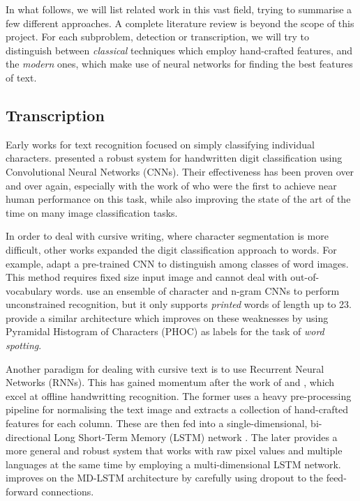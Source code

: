 	In what follows, we will list related work in this vast field, trying to summarise a few different approaches. A complete literature review is beyond the scope of this project. For each subproblem, detection or transcription, we will try to distinguish between \emph{classical} techniques which employ hand-crafted features, and the \emph{modern} ones, which make use of neural networks for finding the best features of text.


	\subsection{Transcription}
		Early works for text recognition focused on simply classifying individual characters.  presented a robust system for handwritten digit classification using Convolutional Neural Networks (CNNs). Their effectiveness has been proven over and over again, especially with the work of \citet{ciresan} who were the first to achieve near human performance on this task, while also improving the state of the art of the time on many image classification tasks.

		In order to deal with cursive writing, where character segmentation is more difficult, other works expanded the digit classification approach to words. For example, \citet{sharma2015adapting} adapt a pre-trained CNN to distinguish among classes of word images. This method requires fixed size input image and cannot deal with out-of-vocabulary words.  use an ensemble of character and n-gram CNNs to perform unconstrained recognition, but it only supports \emph{printed} words of length up to 23.  provide a similar architecture which improves on these weaknesses by using Pyramidal Histogram of Characters (PHOC) as labels for the task of \emph{word spotting}.

		Another paradigm for dealing with cursive text is to use Recurrent Neural Networks (RNNs). This has gained momentum after the work of \citet{graves_LSTM} and \citet{graves_MDLSTM}, which excel at offline handwritting recognition. The former uses a heavy pre-processing pipeline for normalising the text image and extracts a collection of hand-crafted features for each column. These are then fed into a single-dimensional, bi-directional Long Short-Term Memory (LSTM) network \citep{LSTM_original}. The later provides a more general and robust system that works with raw pixel values and multiple languages at the same time by employing a multi-dimensional LSTM network.  improves on the MD-LSTM architecture by carefully using dropout to the feed-forward connections.

